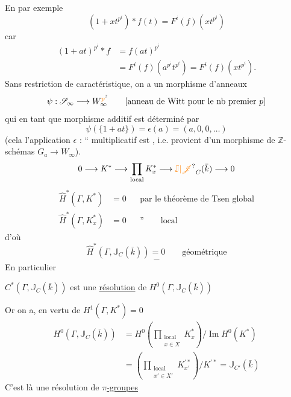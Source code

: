 En  par exemple
\[
(1+xt^{p^i})*f(t)=F^i(f)(xt^{p^i})
\]
car 
\[
\begin{aligned}
(1+at)^{p^i}*f&=f(at)^{p^i}\\
&=F^i(f)(a^{p^i}t^{p^i})=F^i(f)(xt^{p^i}).
\end{aligned}
\]
Sans restriction  de caractéristique, on a un morphisme d'anneaux
\[
\psi:\mathscr{S}_\infty\longrightarrow W_\infty^{{\unsure{p}}}\qquad[\text{anneau de Witt pour le nb premier }p]
\]
qui en tant que morphisme additif est déterminé par
\[
\psi(\{1+at\})=\epsilon(a)=(a,0,0,\ldots)
\]
(cela {} l'application $\epsilon$ : ``{} multiplicatif est {}, i.e. provient d'un morphisme de $\mathbb{Z}$-schémas $G_a\longrightarrow W_\infty$).
\[
0\longrightarrow K^*\longrightarrow\prod_{\mathrm{local}}K_x^*\longrightarrow{\unsure{\mathbb{J}|\mathscr{J}}}_C(\bar{k})\longrightarrow0
\]
\[
\begin{aligned}
\widehat H^*(\Gamma,K^*)&=0&&\text{par le théorème de Tsen global}\\
\widehat H^*(\Gamma,K_x^*)&=0&&\text{''}\qquad\text{local}
\end{aligned}
\]
d'où
\[
\widehat H^*(\Gamma,\mathbb{J}_C(\bar{k}))=0\qquad\text{géométrique}
\]
\[-\]
En particulier


$C^*(\Gamma,\mathbb{J}_C(\bar{k}))$ est une \uline{résolution} de $H^0(\Gamma,\mathbb{J}_C(\bar{k}))$

Or on a, en vertu de $H^1(\Gamma,K^*)=0$
\[
\begin{aligned}
H^0(\Gamma,\mathbb{J}_C(\bar{k}))&=H^0\left(\prod_{\substack{\mathrm{local}\\x\in X}}K_x^*\right)/\operatorname{Im}H^0(K^*)\\
&=\left(\prod_{\substack{\mathrm{local}\\x'\in X'}}K_{x'}^{\prime *}\right)/K^{\prime *}=\mathbb{J}_{C'}(\bar{k})
\end{aligned}
\]
C'est là une résolution  de \uline{$\pi$-groupes}


